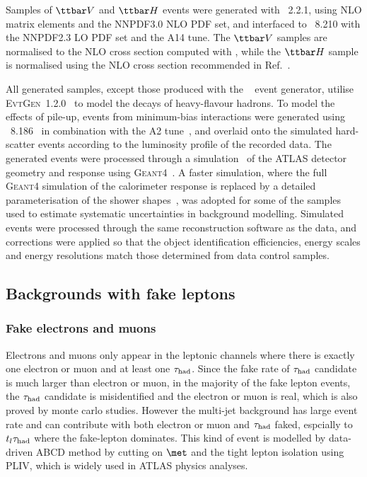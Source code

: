 Samples of $\ttbar V$ and $\ttbar H$ events were generated with {\amcatnlo}~2.2.1, using NLO matrix elements and the NNPDF3.0 NLO PDF set,
and interfaced to {\pythia}~8.210 with the NNPDF2.3 LO PDF set and the A14 tune. 
The $\ttbar V$ samples are normalised to the NLO cross section computed with {\amcatnlo}, while the $\ttbar H$ sample is normalised using 
the NLO cross section recommended in Ref.~\cite{deFlorian:2016spz}.

All generated samples, except those produced with the {\sherpa}~\cite{Gleisberg:2008ta} event generator, 
utilise \textsc{EvtGen}~1.2.0~\cite{Lange:2001uf} to model the decays of heavy-flavour hadrons. 
To model the effects of pile-up, events from minimum-bias interactions were generated using {\pythia}~8.186~\cite{Sjostrand:2007gs}  
in combination with the A2 tune~\cite{ATL-PHYS-PUB-2011-014}, 
and overlaid onto the simulated hard-scatter events according to the luminosity profile of the recorded data. 
The generated events were processed through a simulation~\cite{Aad:2010ah} of the ATLAS detector geometry and response 
using \textsc{Geant4}~\cite{Agostinelli:2002hh}. A faster simulation, where the full \textsc{Geant4} simulation of
the calorimeter response is replaced by a detailed parameterisation of the shower shapes~\cite{FastCaloSim},
was adopted for some of the samples used to estimate systematic uncertainties in background modelling.
Simulated events were processed through the same reconstruction software as the data, and corrections were applied so that the object identification 
efficiencies, energy scales and energy resolutions match those determined from data control samples.

\subsection{Backgrounds with fake leptons}
\label{sec:fakeleptons}

\subsubsection{Fake electrons and muons}
Electrons and muons only appear in the leptonic channels where there is exactly one electron or muon and at least one $\tau_{\mathrm{had}}$. Since the fake rate of $\tau_{\mathrm{had}}$ candidate is much larger than electron or muon, in the majority of the fake lepton events, the $\tau_{\mathrm{had}}$ candidate is misidentified and the electron or muon is real, which is also proved by monte carlo studies. However the multi-jet background has large event rate and can contribute with both electron or muon and $\tau_{\mathrm{had}}$ faked, espcially to $t_l\tau_{\mathrm{had}}$ where the fake-lepton dominates.
This kind of event is modelled by data-driven ABCD method by cutting on $\met$ and the tight lepton isolation using PLIV, which is widely used in ATLAS physics analyses.

